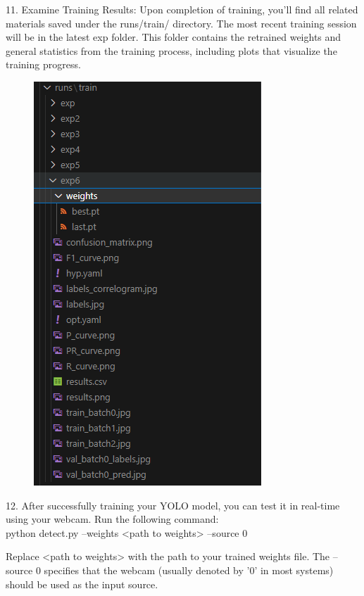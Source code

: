 11.	Examine Training Results: Upon completion of training, you'll find all related materials saved under the runs/train/ directory. The most recent training session will be in the latest exp folder. This folder contains the retrained weights and general statistics from the training process, including plots that visualize the training progress.\\

\begin{figure}[H]
    \centering
    \includegraphics[scale=0.5]{evenbilder/tutorial/tutorial-10.png}
    \label{fig:tutorial-10}
\end{figure}

12. After successfully training your YOLO model, you can test it in real-time using your webcam. Run the following command:\\

python detect.py --weights <path to weights> --source 0

Replace <path to weights> with the path to your trained weights file. The --source 0 specifies that the webcam (usually denoted by '0' in most systems) should be used as the input source.